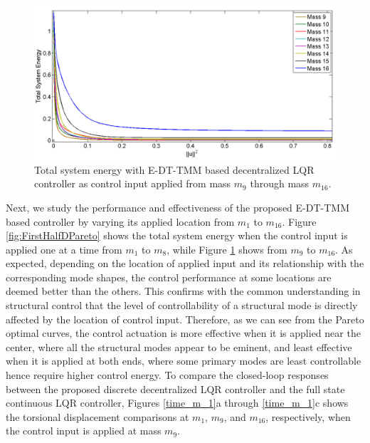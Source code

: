 \documentclass[11pt]{ucthesis}
\begin{document}
\begin{figure}[thpb]
\centering
\includegraphics[width=1\linewidth]{Figures/SecondHalfPareto.png}
\caption{Total system energy with E-DT-TMM based decentralized LQR controller as control input applied from mass $m_9$ through mass $m_{16}$. }
\label{fig:SecHalfDPareto}
\end{figure}

Next, we study the performance and effectiveness of the proposed E-DT-TMM based controller by varying its applied location from $m_1$ to $m_{16}$. Figure \ref{fig:FirstHalfDPareto} shows the total system energy when the control input is applied one at a time from $m_1$ to $m_8$, while Figure \ref{fig:SecHalfDPareto} shows from $m_9$ to $m_{16}$. As expected, depending on the location of applied input and its relationship with the corresponding mode shapes, the control performance at some locations are deemed better than the others. This confirms with the common understanding in structural control that the level of controllability of a structural mode is directly affected by the location of control input. Therefore, as we can see from the Pareto optimal curves, the control actuation is more effective when it is applied near the center, where all the structural modes appear to be eminent, and least effective when it is applied at both ends, where some primary modes are least controllable hence require higher control energy. To compare the closed-loop responses between the proposed discrete decentralized LQR controller and the full state continuous LQR controller, Figures \ref{time_m_1}a through \ref{time_m_1}c shows the torsional displacement comparisons at $m_1$, $m_9$, and $m_{16}$, respectively, when the control input is applied at mass $m_9$.
\end{document}
